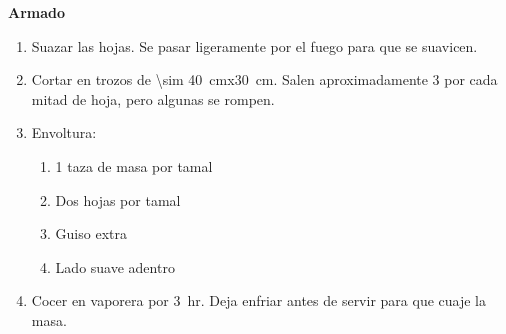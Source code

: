 \textbf{Armado}
\begin{enumerate}
\item Suazar las hojas. Se pasar ligeramente por el fuego para que se suavicen. 
\item Cortar en trozos de \SI{\sim 40}{cm}x\SI{30}{cm}. Salen aproximadamente 3 por cada mitad de hoja, pero algunas se rompen.
\item Envoltura:
\begin{enumerate}
\item 1 taza de masa por tamal
\item Dos hojas por tamal
\item Guiso extra
\item Lado suave adentro
\end{enumerate}
\item Cocer en vaporera por \SI{3}{hr}. Deja enfriar antes de servir para que cuaje la masa.
\end{enumerate}